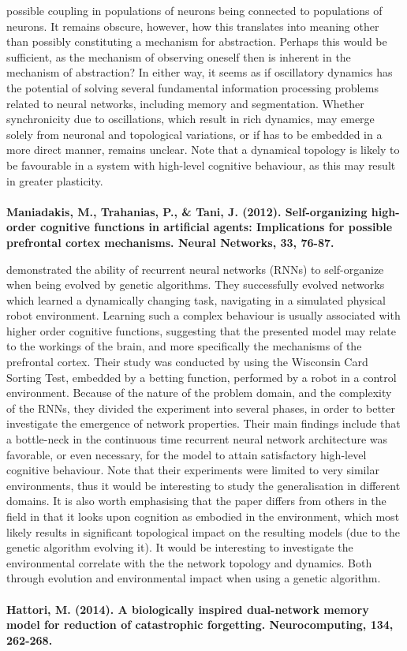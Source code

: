 possible coupling in populations of neurons being connected to populations of neurons. It remains obscure, however, how this translates into meaning other than possibly constituting a mechanism for abstraction. Perhaps this would be sufficient, as the mechanism of observing oneself then is inherent in the mechanism of abstraction? In either way, it seems as if oscillatory dynamics has the potential of solving several fundamental information processing problems related to neural networks, including memory and segmentation. Whether synchronicity due to oscillations, which result in rich dynamics, may emerge solely from neuronal and topological variations, or if has to be embedded in a more direct manner, remains unclear. Note that a dynamical topology is likely to be favourable in a system with high-level cognitive behaviour, as this may result in greater plasticity.
\\
\\
\textbf{Maniadakis, M., Trahanias, P., \& Tani, J. (2012). Self-organizing high-order cognitive functions in artificial agents: Implications for possible prefrontal cortex mechanisms. Neural Networks, 33, 76-87.}

\cite{Maniadakis2012} demonstrated the ability of recurrent neural networks (RNNs) to self-organize when being evolved by genetic algorithms. They successfully evolved networks which learned a dynamically changing task, navigating in a simulated physical robot environment. Learning such a complex behaviour is usually associated with higher order cognitive functions, suggesting that the presented model may relate to the workings of the brain, and more specifically the mechanisms of the prefrontal cortex.
Their study was conducted by using the Wisconsin Card Sorting Test, embedded by a betting function, performed by a robot in a control environment. Because of the nature of the problem domain, and the complexity of the RNNs, they divided the experiment into several phases, in order to better investigate the emergence of network properties. Their main findings include that a bottle-neck in the continuous time recurrent neural network architecture was favorable, or even necessary, for the model to attain satisfactory high-level cognitive behaviour. Note that their experiments were limited to very similar environments, thus it would be interesting to study the generalisation in different domains. It is also worth emphasising that the paper differs from others in the field in that it looks upon cognition as embodied in the environment, which most likely results in significant topological impact on the resulting models (due to the genetic algorithm evolving it). It would be interesting to investigate the environmental correlate with the the network topology and dynamics. Both through evolution and environmental impact when using a genetic algorithm.
\\
\\
\textbf{Hattori, M. (2014). A biologically inspired dual-network memory model for reduction of catastrophic forgetting. Neurocomputing, 134, 262-268.}

